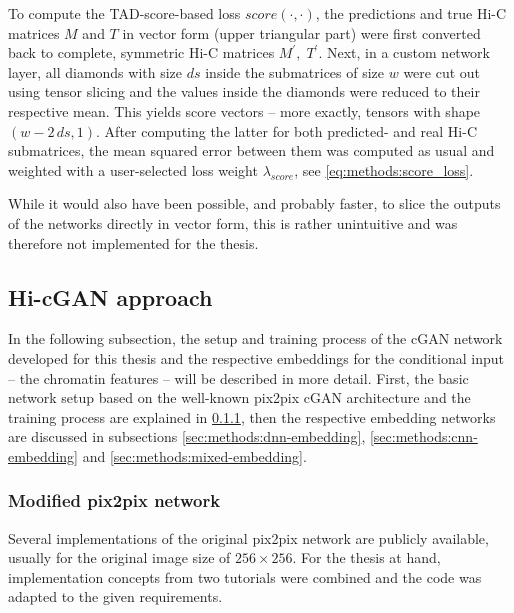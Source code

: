 To compute the TAD-score-based loss $\mathit{score}(\cdot,\cdot)$, the predictions and true Hi-C matrices $M$ and $T$ in vector form (upper triangular part)
were first converted back to complete, symmetric Hi-C matrices $M^\prime,\; T^\prime$. 
Next, in a custom network layer, all diamonds with size $ds$ inside the submatrices of size $w$ were cut out using tensor slicing and the values inside the diamonds were reduced to their respective mean.
This yields score vectors -- more exactly, tensors with shape $(w - 2\,ds, 1)$.
After computing the latter for both predicted- and real Hi-C submatrices, the mean squared error between them was computed as usual and weighted with 
a user-selected loss weight $\lambda_\mathit{score}$, see \cref{eq:methods:score_loss}.

While it would also have been possible, and probably faster, to slice the outputs of the networks directly in vector form, 
this is rather unintuitive and was therefore not implemented for the thesis. 

\subsection{Hi-cGAN approach} \label{sec:methods:hicgan}
In the following subsection, the setup and training process of the cGAN network developed for this thesis and the respective
embeddings for the conditional input -- the chromatin features -- will be described in more detail.
First, the basic network setup based on the well-known pix2pix cGAN architecture \cite{Isola2017} and the training process
are explained in \cref{sec:methods:cGAN_initial}, then the respective embedding networks are discussed in subsections \ref{sec:methods:dnn-embedding},
\ref{sec:methods:cnn-embedding} and \ref{sec:methods:mixed-embedding}.

\subsubsection{Modified pix2pix network}\label{sec:methods:cGAN_initial}
Several implementations of the original pix2pix network \cite{Isola2017} are publicly available, usually for the original image size of $256\times256$.
For the thesis at hand, implementation concepts from two tutorials \cite{tfpix2pix2020, brownlee2019} were combined and the code was adapted to the given requirements.


